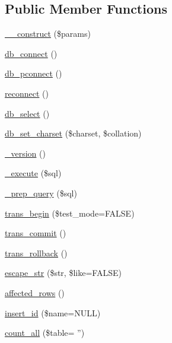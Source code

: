 \subsection*{Public Member Functions}
\begin{DoxyCompactItemize}
\item 
\hyperlink{class_c_i___d_b__pdo__driver_a9162320adff1a1a4afd7f2372f753a3e}{\-\_\-\-\_\-construct} (\$params)
\item 
\hyperlink{class_c_i___d_b__pdo__driver_a6aa545dcb7768f0b62d37cdcf7f09adc}{db\-\_\-connect} ()
\item 
\hyperlink{class_c_i___d_b__pdo__driver_a0f69e662bd02de5bcf98647068e7c653}{db\-\_\-pconnect} ()
\item 
\hyperlink{class_c_i___d_b__pdo__driver_a57c19c642ab3023e28d10c50f86ff0a8}{reconnect} ()
\item 
\hyperlink{class_c_i___d_b__pdo__driver_af0c7f2602586ea2050b19fb36baefb24}{db\-\_\-select} ()
\item 
\hyperlink{class_c_i___d_b__pdo__driver_adc8cd12121dc8edda3adcadd88a97e24}{db\-\_\-set\-\_\-charset} (\$charset, \$collation)
\item 
\hyperlink{class_c_i___d_b__pdo__driver_ac997a462bb342f97f414910f0e033fb6}{\-\_\-version} ()
\item 
\hyperlink{class_c_i___d_b__pdo__driver_a114ab675d89bf8324a41785fb475e86d}{\-\_\-execute} (\$sql)
\item 
\hyperlink{class_c_i___d_b__pdo__driver_a86af88ef0fa6d44ab4691e3f53270339}{\-\_\-prep\-\_\-query} (\$sql)
\item 
\hyperlink{class_c_i___d_b__pdo__driver_a90e153cf190d273336d77cce930587e1}{trans\-\_\-begin} (\$test\-\_\-mode=F\-A\-L\-S\-E)
\item 
\hyperlink{class_c_i___d_b__pdo__driver_af4fbdcdace4aa94a139b64877601fe9b}{trans\-\_\-commit} ()
\item 
\hyperlink{class_c_i___d_b__pdo__driver_a53f76d4dfcd6ac04fb653982442aeef8}{trans\-\_\-rollback} ()
\item 
\hyperlink{class_c_i___d_b__pdo__driver_aaba16891c8c93600a87075800cc5b72b}{escape\-\_\-str} (\$str, \$like=F\-A\-L\-S\-E)
\item 
\hyperlink{class_c_i___d_b__pdo__driver_a77248aaad33eb132c04cc4aa3f4bc8cb}{affected\-\_\-rows} ()
\item 
\hyperlink{class_c_i___d_b__pdo__driver_ae61dc2c85e5516f143f6246c686bc3fc}{insert\-\_\-id} (\$name=N\-U\-L\-L)
\item 
\hyperlink{class_c_i___d_b__pdo__driver_a66111c61856499b091af32502978d4fc}{count\-\_\-all} (\$table= '')

\end{DoxyCompactItemize}
